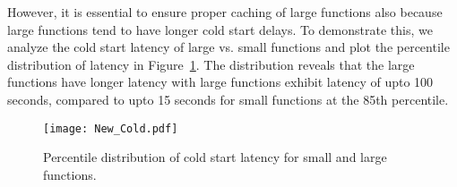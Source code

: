 However, it is essential to ensure proper caching of large functions also because large functions tend to have longer cold start delays. 
To demonstrate this, we analyze the cold start latency of large vs. small functions and plot the percentile distribution of latency in Figure~\ref{fig:cold_start_latency}. 
The distribution reveals that the large functions have longer latency with large functions exhibit latency of upto 100 seconds, compared to upto 15 seconds for small functions at the 85th percentile.


\begin{figure}[h] 
    \centering
    \texttt{[image: New\_Cold.pdf]}
    \caption{Percentile distribution of cold start latency for small and large functions.}
    \label{fig:cold_start_latency}
\end{figure}




